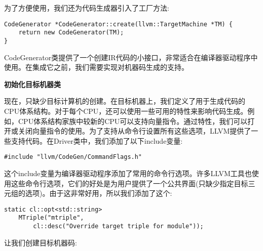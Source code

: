 为了方便使用，我们还为代码生成器引入了工厂方法:\par

\begin{lstlisting}[caption={}]
CodeGenerator *CodeGenerator::create(llvm::TargetMachine *TM) {
	return new CodeGenerator(TM);
}
\end{lstlisting}

CodeGenerator类提供了一个创建IR代码的小接口，非常适合在编译器驱动程序中使用。在集成它之前，我们需要实现对机器码生成的支持。\par

\hspace*{\fill} \par %
\textbf{初始化目标机器类}

现在，只缺少目标计算机的创建。在目标机器上，我们定义了用于生成代码的CPU体系结构。对于每个CPU，还可以使用一些可用的特性来影响代码生成。例如，CPU体系结构家族中较新的CPU可以支持向量指令。通过特性，我们可以打开或关闭向量指令的使用。为了支持从命令行设置所有这些选项，LLVM提供了一些支持代码。在Driver类中，我们添加了以下include变量:\par

\begin{lstlisting}[caption={}]
#include "llvm/CodeGen/CommandFlags.h"
\end{lstlisting}

这个include变量为编译器驱动程序添加了常用的命令行选项。许多LLVM工具也使用这些命令行选项，它们的好处是为用户提供了一个公共界面(只缺少指定目标三元组的选项)。由于这非常好用，所以我们添加了这个:\par

\begin{lstlisting}[caption={}]
static cl::opt<std::string>
	MTriple("mtriple",
		cl::desc("Override target triple for module"));
\end{lstlisting}

让我们创建目标机器码:\par

